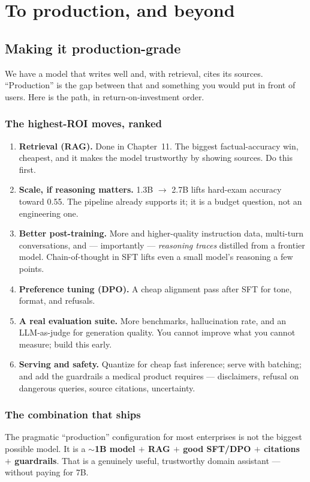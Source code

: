 \part{To production, and beyond}

\chapter{Making it production-grade}

We have a model that writes well and, with retrieval, cites its sources. ``Production'' is the gap between
that and something you would put in front of users. Here is the path, in return-on-investment order.

\section{The highest-ROI moves, ranked}
\begin{enumerate}[leftmargin=2.2em]
  \item \textbf{Retrieval (RAG).} Done in Chapter~11. The biggest factual-accuracy win, cheapest, and it makes
  the model trustworthy by showing sources. Do this first.
  \item \textbf{Scale, if reasoning matters.} 1.3B $\rightarrow$ 2.7B lifts hard-exam accuracy toward 0.55. The
  pipeline already supports it; it is a budget question, not an engineering one.
  \item \textbf{Better post-training.} More and higher-quality instruction data, multi-turn conversations, and
  --- importantly --- \emph{reasoning traces} distilled from a frontier model. Chain-of-thought in SFT lifts
  even a small model's reasoning a few points.
  \item \textbf{Preference tuning (DPO).} A cheap alignment pass after SFT for tone, format, and refusals.
  \item \textbf{A real evaluation suite.} More benchmarks, hallucination rate, and an LLM-as-judge for
  generation quality. You cannot improve what you cannot measure; build this early.
  \item \textbf{Serving and safety.} Quantize for cheap fast inference; serve with batching; and add the
  guardrails a medical product requires --- disclaimers, refusal on dangerous queries, source citations,
  uncertainty.
\end{enumerate}

\section{The combination that ships}
The pragmatic ``production'' configuration for most enterprises is not the biggest possible model. It is a
\textbf{$\sim$1B model $+$ RAG $+$ good SFT/DPO $+$ citations $+$ guardrails}. That is a genuinely useful,
trustworthy domain assistant --- without paying for 7B.

